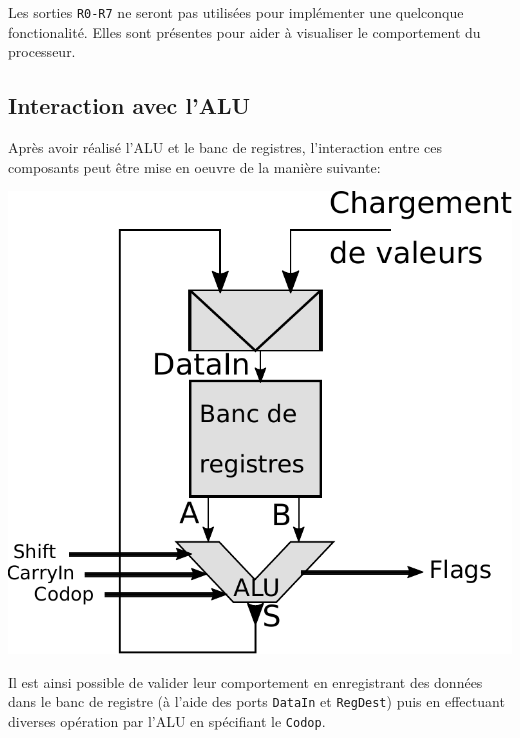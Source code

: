 Les sorties \texttt{R0-R7} ne seront pas utilisées pour implémenter une quelconque fonctionalité. Elles sont présentes pour aider à visualiser le comportement du processeur.

\subsection{Interaction avec l'ALU}

Après avoir réalisé l'ALU et le banc de registres, l'interaction entre ces composants peut être mise en oeuvre de la manière suivante:

\hspace{14em}\includegraphics[scale=0.5]{pictures/ALU_Registers.pdf}

Il est ainsi possible de valider leur comportement en enregistrant des données dans le banc de registre (à l'aide des ports \texttt{DataIn} et \texttt{RegDest})
puis en effectuant diverses opération par l'ALU en spécifiant  le \texttt{Codop}.
